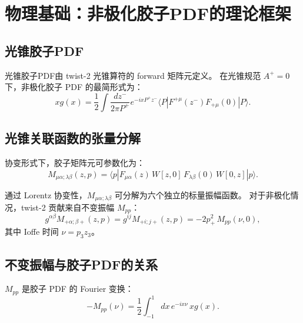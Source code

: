 \documentclass[12pt,a4paper]{ctexart}
\begin{document}
\section{物理基础：非极化胶子PDF的理论框架}\label{sec:physics}

\subsection{光锥胶子PDF}

光锥胶子PDF由 twist-2 光锥算符的 forward 矩阵元定义\cite{note_of_gluon_PDFs}。
在光锥规范 $A^{+}=0$ 下，非极化胶子 PDF 的最简形式为：
\begin{equation}\label{eq:gluon_pdf_lightcone}
x g(x) = \frac{1}{2} \int \frac{dz^{-}}{2\pi P^{+}} e^{-i x P^{+} z^{-}}
    \langle P | F^{+\mu}(z^{-}) F_{+\mu}(0) | P \rangle.
\end{equation}

\subsection{光锥关联函数的张量分解}

协变形式下，胶子矩阵元可参数化为\cite{note_of_gluon_PDFs, gluon_pdf_derivation}：
\begin{equation}\label{eq:M_munu}
M_{\mu\alpha; \lambda\beta}(z, p) = \langle p |
    F_{\mu\alpha}(z) \, W[z, 0] \, F_{\lambda\beta}(0) \, W[0, z] | p \rangle.
\end{equation}

通过 Lorentz 协变性，$M_{\mu\alpha;\lambda\beta}$ 可分解为六个独立的标量振幅函数。
对于非极化情况，twist-2 贡献来自不变振幅 $M_{pp}$：
\begin{equation}\label{eq:Mpp_relation}
g^{\alpha\beta} M_{+\alpha; \beta+}(z, p)
    = g^{ij} M_{+i; j+}(z, p)
    = -2 p_{+}^{2} \, M_{pp}(\nu, 0),
\end{equation}
其中 Ioffe 时间 $\nu = p_{3} z_{3}$。

\subsection{不变振幅与胶子PDF的关系}

$M_{pp}$ 是胶子 PDF 的 Fourier 变换\cite{note_of_gluon_PDFs}：
\begin{equation}\label{eq:Mpp_pdf}
- M_{pp}(\nu) = \frac{1}{2} \int_{-1}^{1} dx \, e^{-i x \nu} \, x g(x).
\end{equation}
\end{document}
